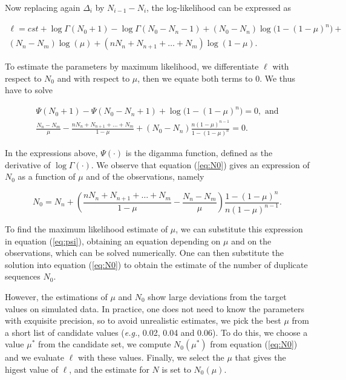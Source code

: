 \documentclass{article}
\begin{document}
Now replacing again $\Delta_i$ by $N_{i-1}-N_i$, the log-likelihood can be
expressed as

\begin{equation}
\begin{split}
\ell = cst + \log \Gamma(N_0+1) - \log \Gamma(N_0-N_n-1)
+ (N_0-N_n) \log \big(1-(1-\mu)^n\big) + \\
(N_n-N_m) \log(\mu) + (nN_n + N_{n+1} + \ldots + N_m) \log(1-\mu).
\end{split}
\end{equation}

To estimate the parameters by maximum likelihood, we differentiate $\ell$
with respect to $N_0$ and with respect to $\mu$, then we equate both terms
to 0. We thus have to solve

\begin{gather}
\label{eq:psi}
\Psi(N_0+1)-\Psi(N_0-N_n+1) +
  \log\big( 1-(1-\mu)^n \big) = 0, \text{ and} \\
\label{eq:N0}
\frac{N_n-N_m}{\mu}
-\frac{nN_n + N_{n+1}+\ldots+N_m}{1-\mu} +
(N_0-N_n)\frac{n(1-\mu)^{n-1}}{1-(1-\mu)^n} = 0.
\end{gather}

In the expressions above, $\Psi(\cdot)$ is the digamma function, defined
as the derivative of $\log \Gamma(\cdot)$. We observe that equation
(\ref{eq:N0}) gives an expression of $N_0$ as a function of $\mu$ and of
the observations, namely

\begin{equation*}
N_0 = N_n +
\left(\frac{nN_n+N_{n+1}+\ldots+N_m}{1-\mu}-
\frac{N_n-N_m}{\mu} \right)
\frac{1-(1-\mu)^n}{n(1-\mu)^{n-1}}.
\end{equation*}

To find the maximum likelihood estimate of $\mu$, we can substitute this
expression in equation (\ref{eq:psi}), obtaining an equation depending on
$\mu$ and on the observations, which can be solved numerically. One can
then substitute the solution into equation (\ref{eq:N0}) to obtain the
estimate of the number of duplicate sequences $N_0$.

However, the estimations of $\mu$ and $N_0$ show large deviations from the
target values on simulated data. In practice, one does not need to know
the parameters with exquisite precision, so to avoid unrealistic
estimates, we pick the best $\mu$ from a short list of candidate values
(\textit{e.g.}, 0.02, 0.04 and 0.06). To do this, we choose a value
$\mu^*$ from the candidate set, we compute $N_0(\mu^*)$ from equation
(\ref{eq:N0}) and we evaluate $\ell$ with these values. Finally, we select
the $\mu$ that gives the higest value of $\ell$, and the estimate for
$N$ is set to $N_0(\mu)$.
\end{document}
